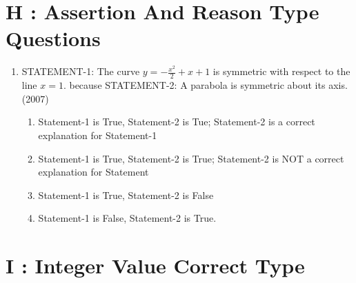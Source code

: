 \documentclass[12pt]{article}
\begin{document}
\section*{H   :  Assertion And Reason Type Questions}

\begin{enumerate}
\item STATEMENT-1: The curve $y=-\frac{x^2}{2}+x+1$ is symmetric with respect to the line $x=1$. because
STATEMENT-2: A parabola is symmetric about its axis.(2007)
\begin{enumerate}
\item Statement-1 is True, Statement-2 is Tue; Statement-2 is a correct explanation for Statement-1
\item Statement-1 is True, Statement-2 is True; Statement-2 is NOT a correct explanation for Statement
\item Statement-1 is True, Statement-2 is False
\item Statement-1 is False, Statement-2 is True.
\end{enumerate}
\end{enumerate}
\section*{I    : Integer Value Correct Type }
\end{document}
